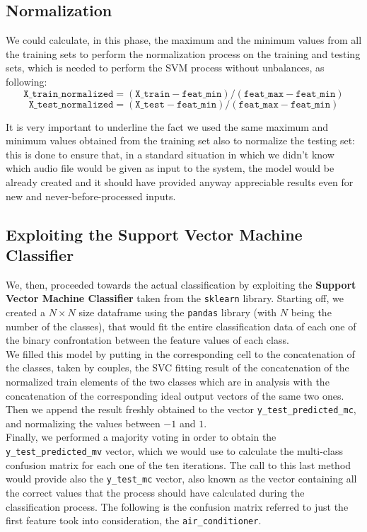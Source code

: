 \documentclass[11pt]{article}
\begin{document}
\subsection{Normalization}
We could calculate, in this phase, the maximum and the minimum values from all the training sets to perform the normalization process on the training and testing sets, which is needed to perform the SVM process without unbalances, as following:
\begin{equation}
\mathtt{X{\_}train{\_}normalized =  (X{\_}train - feat{\_}min) / (feat{\_}max - feat{\_}min)}
\end{equation}
\begin{equation}
\mathtt{X{\_}test{\_}normalized = (X{\_}test - feat{\_}min) / (feat{\_}max - feat{\_}min)}
\end{equation}

It is very important to underline the fact we used the same maximum and minimum values obtained from the training set also to normalize the testing set: this is done to ensure that, in a standard situation in which we didn't know which audio file would be given as input to the system, the model would be already created and it should have provided anyway appreciable results even for new and never-before-processed inputs.

\subsection{Exploiting the Support Vector Machine Classifier}
We, then, proceeded towards the actual classification by exploiting the \textbf{Support Vector Machine Classifier} taken from the \texttt{sklearn} library. Starting off, we created a $N\times N$ size dataframe using the \texttt{pandas} library (with $N$ being the number of the classes), that would fit the entire classification data of each one of the binary confrontation between the feature values of each class.\\
We filled this model by putting in the corresponding cell to the concatenation of the classes, taken by couples, the SVC fitting result of the concatenation of the normalized train elements of the two classes which are in analysis with the concatenation of the corresponding ideal output vectors of the same two ones. Then we append the result freshly obtained to the vector \texttt{y{\_}test{\_}predicted{\_}mc}, and normalizing the values between $-1$ and $1$.\\
Finally, we performed a majority voting in order to obtain the \texttt{y{\_}test{\_}predicted{\_}mv} vector, which we would use to calculate the multi-class confusion matrix for each one of the ten iterations. The call to this last method would provide also the \texttt{y{\_}test{\_}mc} vector, also known as the vector containing all the correct values that the process should have calculated during the classification process. The following is the confusion matrix referred to just the first feature took into consideration, the \texttt{air{\_}conditioner}.
\end{document}
